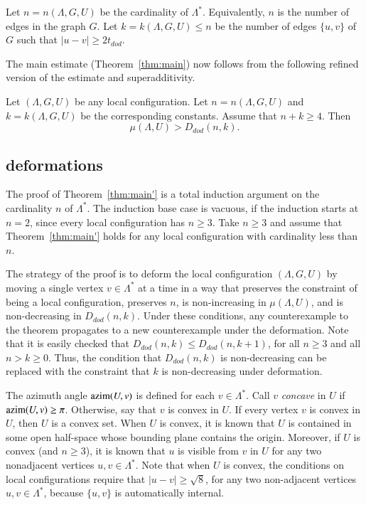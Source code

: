 
Let $n=n(\Lambda,G,U)$ be the cardinality of $\Lambda^*$.  Equivalently,
$n$ is the number of edges in the graph $G$.  Let
$k=k(\Lambda,G,U)\le n$ be the number of edges $\{u,v\}$ of $G$ such
that $|u-v|\ge 2t_{dod}$. 

The main estimate (Theorem~\ref{thm:main}) now follows from the following
refined version of the estimate and superadditivity.

\begin{theorem}\label{thm:main'}  
Let $(\Lambda,G,U)$ be any local configuration.
Let $n=n(\Lambda,G,U)$ and $k=k(\Lambda,G,U)$ be the corresponding constants.
Assume that $n+k\ge 4$.  Then
   $$
   \mu(\Lambda,U) > D_{dod}(n,k).
   $$
\end{theorem}

\subsection{deformations}


The proof of Theorem~\ref{thm:main'} is a total induction argument
on  the cardinality $n$ of $\Lambda^*$.  The induction base case
is vacuous, if the induction starts at $n=2$, since every
local configuration has $n\ge 3$.
Take $n\ge 3$ and assume that
Theorem~\ref{thm:main'} holds for any local configuration with
cardinality less than $n$.  

The strategy of the proof is to deform the local configuration $(\Lambda,G,U)$ by moving a single vertex $v\in\Lambda^*$ at a time in a way
that preserves the constraint of being a local configuration,
preserves $n$, 
is non-increasing in $\mu(\Lambda,U)$, 
and is non-decreasing in $D_{dod}(n,k)$.
Under these conditions, any counterexample to the theorem propagates 
to a new counterexample under the deformation.
Note that it is easily checked that $D_{dod}(n,k) \le D_{dod}(n,k+1)$, for all
$n\ge 3$ and all $n> k\ge0$.  Thus, the condition that $D_{dod}(n,k)$
is non-decreasing can be replaced with the constraint that $k$
is non-decreasing under deformation.

The azimuth angle
${\operatorname{azim}}(U,v)$ is defined for each $v\in\Lambda^*$.  
Call $v$ {\it concave} in $U$
if ${\operatorname{azim}}(U,v)\ge\pi$.  Otherwise, say that $v$ is convex
in $U$.  If every vertex $v$ is convex in $U$, then $U$
is a convex set.  When $U$ is convex, it is known that $U$
is contained in some open half-space whose bounding plane
contains the origin.  Moreover,
if $U$ is convex (and $n\ge 3$),
it is known that $u$ is visible from $v$ in $U$
for any two nonadjacent vertices $u,v\in\Lambda^*$.  Note that when $U$ is 
convex, the conditions on local configurations require that
$|u-v|\ge\sqrt8$, for any two non-adjacent vertices $u,v\in\Lambda^*$,
because $\{u,v\}$ is automatically internal.

